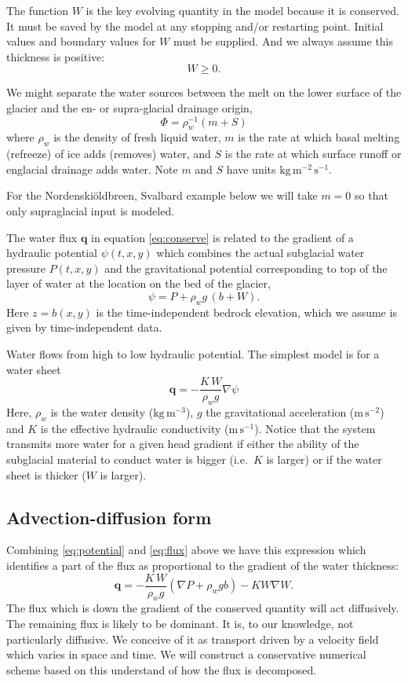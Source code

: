 \documentclass[12pt,final]{amsart}%
\newcommand\bq{\mathbf{q}}
\newcommand{\grad}{\nabla}
\begin{document}
The function $W$ is the key evolving quantity in the model because it is conserved.  It must be saved by the model at any stopping and/or restarting point.  Initial values and boundary values for $W$ must be supplied.  And we always assume this thickness is positive:
\begin{equation}
W \ge 0.
\end{equation}

We might separate the water sources between the melt on the lower surface of the glacier and the en- or supra-glacial drainage origin,
  $$\Phi = \rho_w^{-1} \left(m + S\right)$$
where $\rho_w$ is the density of fresh liquid water, $m$ is the rate at which basal melting (refreeze) of ice adds (removes) water, and $S$ is the rate at which surface runoff or englacial drainage adds water.  Note $m$ and $S$ have units $\text{kg}\,\text{m}^{-2}\,\text{s}^{-1}$.

\newcommand{\Nbreen}{Nordenski\"oldbreen\xspace}
For the \Nbreen, Svalbard example below we will take $m=0$ so that only supraglacial input is modeled.

The water flux $\bq$ in equation \eqref{eq:conserve} is related to the gradient of a hydraulic potential $\psi(t,x,y)$ which combines the actual subglacial water pressure $P(t,x,y)$ and the gravitational potential corresponding to top of the layer of water at the location on the bed of the glacier,
\begin{equation} \label{eq:potential}
\psi = P + \rho_w g\, (b+W).
\end{equation}
Here $z=b(x,y)$ is the time-independent bedrock elevation, which we assume is given by time-independent data.

Water flows from high to low hydraulic potential.  The simplest model is for a water sheet \citep{Clarke05}
\begin{equation}  \label{eq:flux}
\bq = - \frac{K \, W}{\rho_w g} \grad \psi
\end{equation}
Here, $\rho_w$ is the water density ($\text{kg}\,\text{m}^{-3}$), $g$ the gravitational acceleration ($\text{m}\,\text{s}^{-2}$) and $K$ is the effective hydraulic conductivity ($\text{m}\,\text{s}^{-1}$).  Notice that the system transmits more water for a given head gradient if either the ability of the subglacial material to conduct water is bigger (i.e.~$K$ is larger) or if the water sheet is thicker ($W$ is larger).

\subsection*{Advection-diffusion form}  Combining \eqref{eq:potential} and \eqref{eq:flux} above we have this expression which identifies a part of the flux as proportional to the gradient of the water thickness:
	$$\bq = - \frac{K\, W}{\rho_w g} \left(\grad P + \rho_w g b\right) - K W \grad W.$$
The flux which is down the gradient of the conserved quantity will act diffusively.  The remaining flux is likely to be dominant.  It is, to our knowledge, not particularly diffusive.  We conceive of it as transport driven by a velocity field which varies in space and time.  We will construct a conservative numerical scheme based on this understand of how the flux is decomposed.
\end{document}
